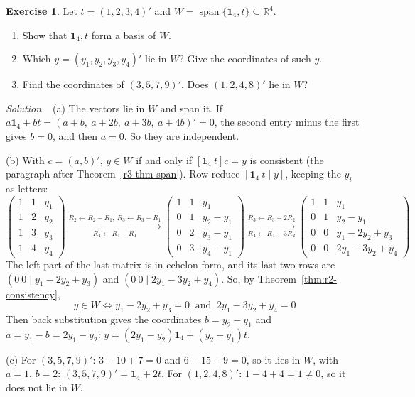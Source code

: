 \documentclass[12pt]{article}
\newcommand{\R}{\mathbb R}
\newcommand{\one}{\mathbf 1}
\DeclareMathOperator{\Span}{span}
\theoremstyle{definition}
\newtheorem{exercise}{Exercise}
\newenvironment{solution}{\par\noindent\textit{Solution.}\ }{\par\smallskip}
\begin{document}
\begin{exercise}\label{r3-ex-trend}
Let \(t=(1,2,3,4)'\) and \(W=\Span\{\one_4,t\}\subseteq\R^4\).
\begin{enumerate}
\item Show that \(\one_4,t\) form a basis of \(W\).
\item Which \(y=(y_1,y_2,y_3,y_4)'\) lie in \(W\)? Give the coordinates of such \(y\).
\item Find the coordinates of \((3,5,7,9)'\). Does \((1,2,4,8)'\) lie in \(W\)?
\end{enumerate}
\end{exercise}
\begin{solution}
(a) The vectors lie in \(W\) and span it. If \(a\one_4+bt=(a+b,\ a+2b,\ a+3b,\ a+4b)'=0\), the
second entry minus the first gives \(b=0\), and then \(a=0\). So they are independent.

(b) With \(c=(a,b)'\), \(y\in W\) if and only if \([\one_4\ t]c=y\) is consistent (the paragraph after
Theorem~\ref{r3-thm-span}). Row-reduce \([\one_4\ t\mid y]\), keeping the \(y_i\) as letters:
\[
\left(\begin{array}{cc|c}1&1&y_1\\1&2&y_2\\1&3&y_3\\1&4&y_4\end{array}\right)
\xrightarrow[R_4\leftarrow R_4-R_1]{R_2\leftarrow R_2-R_1,\ R_3\leftarrow R_3-R_1}
\left(\begin{array}{cc|c}1&1&y_1\\0&1&y_2-y_1\\0&2&y_3-y_1\\0&3&y_4-y_1\end{array}\right)
\xrightarrow[R_4\leftarrow R_4-3R_2]{R_3\leftarrow R_3-2R_2}
\left(\begin{array}{cc|c}1&1&y_1\\0&1&y_2-y_1\\0&0&y_1-2y_2+y_3\\0&0&2y_1-3y_2+y_4\end{array}\right)
\]
The left part of the last matrix is in echelon form, and its last two rows are \((0\ 0\mid y_1-2y_2+y_3)\) and
\((0\ 0\mid 2y_1-3y_2+y_4)\). So, by Theorem~\ref{thm:r2-consistency},
\[
y\in W\iff y_1-2y_2+y_3=0\ \text{ and }\ 2y_1-3y_2+y_4=0
\]
Then back substitution gives the coordinates \(b=y_2-y_1\) and \(a=y_1-b=2y_1-y_2\):
\(y=(2y_1-y_2)\one_4+(y_2-y_1)t\).

(c) For \((3,5,7,9)'\): \(3-10+7=0\) and \(6-15+9=0\), so it lies in \(W\), with \(a=1\),
\(b=2\): \((3,5,7,9)'=\one_4+2t\). For \((1,2,4,8)'\): \(1-4+4=1\ne0\), so it does not lie in
\(W\).
\end{solution}
\end{document}

